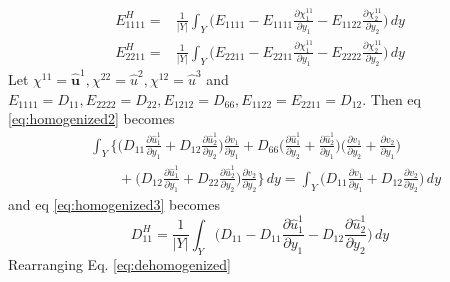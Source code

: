 \documentclass[openright,twoside]{iitkthesis}
\newcommand{\e}[1]{\textbf{#1}}
\begin{document}
\begin{eqnarray}
\label{eq:homogenized3}
E^H_{1111} = &\frac{1}{|Y|}\int_Y\bigg ( E_{1111} - E_{1111}\frac{\partial \chi^{11}_1}{\partial y_1} - E_{1122}\frac{\partial \chi^{11}_2}{\partial y_2}\bigg )\,dy\\
E^H_{2211} = &\frac{1}{|Y|}\int_Y\bigg ( E_{2211} - E_{2211}\frac{\partial \chi^{11}_1}{\partial y_1} - E_{2222}\frac{\partial \chi^{11}_2}{\partial y_2}\bigg )\,dy
\end{eqnarray}
Let $\chi^{11} = \hat{\e u}^1, \chi^{22} = \hat u^2, \chi^{12} = \hat u^3$ and $E_{1111} = D_{11}, E_{2222} = D_{22}, E_{1212} = D_{66}, E_{1122} = E_{2211} = D_{12}$. Then eq \eqref{eq:homogenized2} becomes
\begin{equation}
\label{eq:dehomogenized}
\begin{split}
&\int_Y \bigg \{\bigg ( D_{11}\frac{\partial \hat u^1_1}{\partial y_1} + D_{12}\frac{\partial \hat u^1_2}{\partial y_2}\bigg )\frac{\partial v_1}{\partial y_1}
+ D_{66}\bigg (\frac{\partial \hat u^1_1}{\partial y_2} + \frac{\partial \hat u^1_2}{\partial y_1}\bigg )\bigg (\frac{\partial v_1}{\partial y_2} +\frac{\partial v_2}{\partial y_1}\bigg )\\
&\qquad + \bigg (D_{12}\frac{\partial \hat u^1_1}{\partial y_1} + D_{22}\frac{\partial \hat u^1_2}{\partial y_2}\bigg )\frac{\partial v_2}{\partial y_2}\bigg \}\,dy = \int_Y\bigg (D_{11}\frac{\partial v_1}{\partial y_1}+D_{12}\frac{\partial v_2}{\partial y_2}\bigg )\, dy
\end{split}
\end{equation}
and eq \eqref{eq:homogenized3} becomes
\begin{equation}
\label{Dhomo}
D^H_{11} = \frac{1}{|Y|}\int_Y\bigg (D_{11}-D_{11}\frac{\partial\hat u^1_1}{\partial y_1} - D_{12}\frac{\partial \hat u^1_2}{\partial y_2}\bigg )\,dy
\end{equation}
Rearranging Eq. \eqref{eq:dehomogenized}
\end{document}
